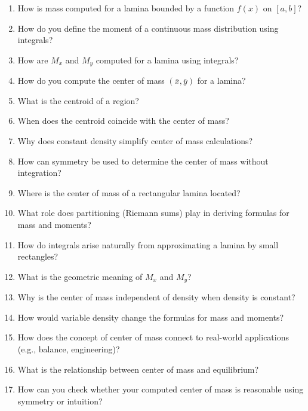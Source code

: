 \begin{enumerate}
\item How is mass computed for a lamina bounded by a function $f(x)$ on $[a,b]$?

\item How do you define the moment of a continuous mass distribution using integrals?

\item How are $M_x$ and $M_y$ computed for a lamina using integrals?

\item How do you compute the center of mass $(\bar{x}, \bar{y})$ for a lamina?

\item What is the centroid of a region?

\item When does the centroid coincide with the center of mass?

\item Why does constant density simplify center of mass calculations?

\item How can symmetry be used to determine the center of mass without integration?

\item Where is the center of mass of a rectangular lamina located?

\item What role does partitioning (Riemann sums) play in deriving formulas for mass and moments?

\item How do integrals arise naturally from approximating a lamina by small rectangles?

\item What is the geometric meaning of $M_x$ and $M_y$?

\item Why is the center of mass independent of density when density is constant?

\item How would variable density change the formulas for mass and moments?

\item How does the concept of center of mass connect to real-world applications (e.g., balance, engineering)?

\item What is the relationship between center of mass and equilibrium?

\item How can you check whether your computed center of mass is reasonable using symmetry or intuition?


\end{enumerate}
